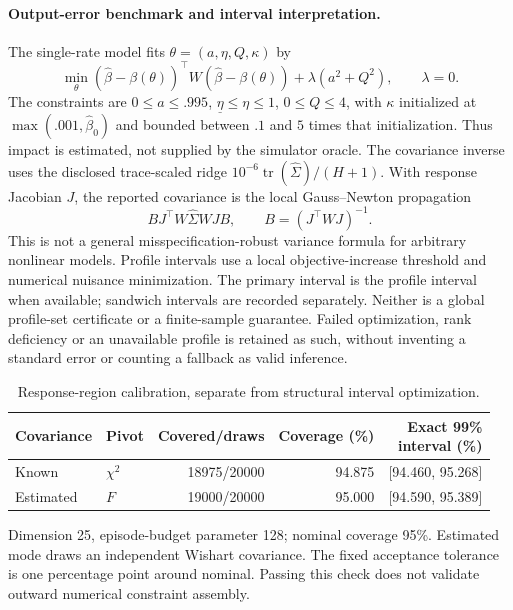 \documentclass[10pt,twocolumn,letterpaper]{article}
\theoremstyle{definition}
\theoremstyle{remark}
\begin{document}
\paragraph{Output-error benchmark and interval interpretation.}
The single-rate model fits $\theta=(a,\eta,Q,\kappa)$ by
\begin{equation}
 \min_\theta (\hat\beta-\beta(\theta))^\top W(\hat\beta-\beta(\theta))
       +\lambda(a^2+Q^2),\qquad \lambda=0.
 \label{eq:output_error_obj}
\end{equation}
The constraints are $0\le a\le.995$, $\underline\eta\le\eta\le1$,
$0\le Q\le4$, with $\kappa$ initialized at $\max(.001,\hat\beta_0)$
and bounded between $.1$ and $5$ times that initialization. Thus impact is
estimated, not supplied by the simulator oracle. The covariance inverse uses
the disclosed trace-scaled ridge $10^{-6}\operatorname{tr}(\widehat\Sigma)/(H+1)$.
With response Jacobian $J$, the reported covariance is the local
Gauss--Newton propagation
\[
 B J^\top W\widehat\Sigma WJ B,\qquad B=(J^\top WJ)^{-1}.
\]
This is not a general misspecification-robust variance formula for arbitrary
nonlinear models. Profile intervals use a local objective-increase threshold
and numerical nuisance minimization. The primary interval is the profile
interval when available; sandwich intervals are recorded separately. Neither
is a global profile-set certificate or a finite-sample guarantee. Failed
optimization, rank deficiency or an unavailable profile is retained as such,
without inventing a standard error or counting a fallback as valid inference.

\begin{table}[htbp]\centering\small
\caption{Response-region calibration, separate from structural interval optimization.}
\label{tab:response_pivot_calibration}
\begin{tabular*}{\textwidth}{@{\extracolsep{\fill}}llrrr@{}}
\toprule
Covariance & Pivot & Covered/draws & Coverage (\%) & \shortstack{Exact 99\%\\interval (\%)} \\
\midrule
Known & $\chi^2$ & 18975/20000 & 94.875 & [94.460, 95.268] \\
Estimated & $F$ & 19000/20000 & 95.000 & [94.590, 95.389] \\
\bottomrule\end{tabular*}
\par\smallskip\begin{minipage}{\textwidth}\footnotesize Dimension 25, episode-budget parameter 128; nominal coverage 95\%. Estimated mode draws an independent Wishart covariance. The fixed acceptance tolerance is one percentage point around nominal. Passing this check does not validate outward numerical constraint assembly.\end{minipage}
\end{table}
\end{document}
